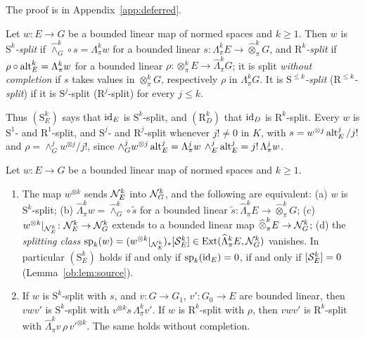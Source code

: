 The proof is in Appendix~\ref{app:deferred}.

\begin{definition}\label{ob:def:split-operators}
Let $w\colon E\to G$ be a bounded linear map of normed spaces and $k\ge1$. Then $w$ is \emph{$\mathrm S^k$-split} if
$\widehat\wedge^k_G\circ s=\Lambda^k_\pi w$ for a bounded linear $s\colon\Lambda^k_\pi E\to\widehat\otimes^k_\pi G$, and
\emph{$\mathrm R^k$-split} if $\rho\circ\operatorname{alt}^k_E=\Lambda^k_\pi w$ for a bounded linear
$\rho\colon\otimes^k_\pi E\to\widehat\Lambda^k_\pi G$; it is split \emph{without completion} if $s$ takes values in
$\otimes^k_\pi G$, respectively $\rho$ in $\Lambda^k_\pi G$. It is \emph{$\mathrm S^{\le k}$-split}
(\emph{$\mathrm R^{\le k}$-split}) if it is $\mathrm S^j$-split ($\mathrm R^j$-split) for every $j\le k$.
\end{definition}

Thus $(\mathrm S^k_E)$ says that $\mathrm{id}_E$ is $\mathrm S^k$-split, and $(\mathrm R^k_D)$ that $\mathrm{id}_D$ is
$\mathrm R^k$-split. Every $w$ is $\mathrm S^1$- and $\mathrm R^1$-split, and $\mathrm S^j$- and $\mathrm R^j$-split
whenever $j!\ne0$ in $K$, with $s=w^{\otimes j}\operatorname{alt}^j_E/j!$ and $\rho=\wedge^j_Gw^{\otimes j}/j!$, since
$\wedge^j_Gw^{\otimes j}\operatorname{alt}^j_E=\Lambda^j_\pi w\,\wedge^j_E\operatorname{alt}^j_E=j!\,\Lambda^j_\pi w$.

\begin{proposition}\label{ob:prop:split-operators}
Let $w\colon E\to G$ be a bounded linear map of normed spaces and $k\ge1$.
\begin{enumerate}
\item The map $w^{\otimes k}$ sends $\mathcal N^k_E$ into $\mathcal N^k_G$, and the following are equivalent: (a) $w$ is
$\mathrm S^k$-split; (b) $\widehat\Lambda^k_\pi w=\widehat\wedge^k_G\circ\tilde s$ for a bounded linear
$\tilde s\colon\widehat\Lambda^k_\pi E\to\widehat\otimes^k_\pi G$; (c) $w^{\otimes k}|_{\mathcal N^k_E}\colon\mathcal N^k_E\to\mathcal N^k_G$
extends to a bounded linear map $\widehat\otimes^k_\pi E\to\mathcal N^k_G$; (d) the \emph{splitting class}
$\operatorname{sp}_k(w)=(w^{\otimes k}|_{\mathcal N^k_E})_*[\mathcal S^k_E]\in\operatorname{Ext}(\widehat\Lambda^k_\pi E,\mathcal N^k_G)$ vanishes. In
particular $(\mathrm S^k_E)$ holds if and only if $\operatorname{sp}_k(\mathrm{id}_E)=0$, if and only if $[\mathcal S^k_E]=0$
(Lemma~\ref{ob:lem:source}).
\item If $w$ is $\mathrm S^k$-split with $s$, and $v\colon G\to G_1$, $v'\colon G_0\to E$ are bounded linear, then $vwv'$
is $\mathrm S^k$-split with $v^{\otimes k}s\,\Lambda^k_\pi v'$. If $w$ is $\mathrm R^k$-split with $\rho$, then $vwv'$ is
$\mathrm R^k$-split with $\widehat\Lambda^k_\pi v\,\rho\,v'^{\otimes k}$. The same holds without completion.
\end{enumerate}
\end{proposition}

